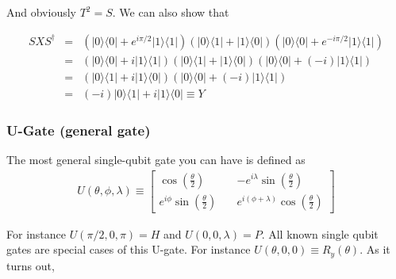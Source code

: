 \documentclass[preprint,aps,prd,nofootinbib,superscriptaddress]{revtex4-2}
\begin{document}
And obviously $T^2 = S$. We can also show that

\begin{eqnarray} \label{eqn:Y_from_X}
S X S^\dagger &=& (|0 \rangle \langle 0| + e^{i\pi/2}|1 \rangle \langle 1|) (|0 \rangle \langle 1| + |1 \rangle \langle 0|) (|0 \rangle \langle 0| + e^{-i\pi/2}|1 \rangle \langle 1|)
\nonumber \\
&=& (|0 \rangle \langle 0| + i|1 \rangle \langle 1|) (|0 \rangle \langle 1| + |1 \rangle \langle 0|) (|0 \rangle \langle 0| + (-i) |1 \rangle \langle 1|)
\nonumber \\
&=& (|0 \rangle \langle 1| + i|1 \rangle \langle 0|) (|0 \rangle \langle 0| + (-i) |1 \rangle \langle 1|)
\nonumber \\
&=& (-i)|0 \rangle \langle 1| + i|1 \rangle \langle 0| \equiv Y
\end{eqnarray}

\subsubsection{U-Gate (general gate)}
%
The most general single-qubit gate you can have is defined as
%
\begin{eqnarray}
U(\theta,\phi,\lambda) \equiv 
\begin{bmatrix} 
\cos\left(\frac{\theta}{2}\right) \quad & -e^{i \lambda}\sin\left(\frac{\theta}{2}\right) \\ 
e^{i\phi} \sin\left(\frac{\theta}{2}\right) \quad & e^{i(\phi+\lambda)} \cos\left(\frac{\theta}{2}\right) \end{bmatrix} 
\end{eqnarray}

For instance $U(\pi/2,0,\pi)=H$ and $U(0,0,\lambda)=P$. All known single qubit gates are special cases of this U-gate. For instance $U(\theta,0,0)\equiv R_y (\theta)$. As it turns out,
\end{document}
